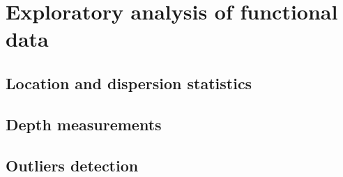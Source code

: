 \chapter{Exploratory analysis of functional data}

\section{Location and dispersion statistics}
\section{Depth measurements}
\section{Outliers detection}
